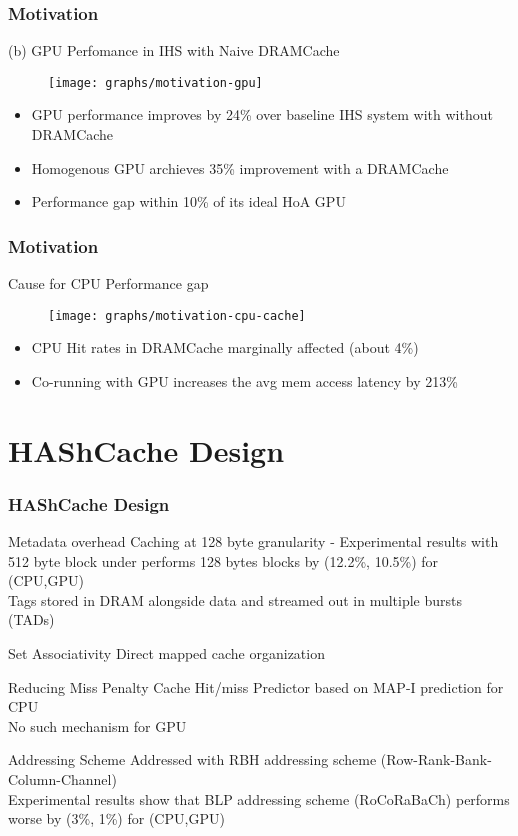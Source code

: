\documentclass{beamer}
\begin{document}
\begin{frame}
\frametitle{Motivation}    
(b) GPU Perfomance in IHS with Naive DRAMCache    
    \begin{figure}    	
    	\texttt{[image: graphs/motivation-gpu]}
    \end{figure}
\begin{itemize}
	\item GPU performance improves by 24\% over baseline IHS system with without DRAMCache
	\item Homogenous GPU archieves 35\% improvement with a DRAMCache
	\item Performance gap within 10\%  of its ideal HoA GPU
\end{itemize}    
\end{frame}

\begin{frame}
\frametitle{Motivation}
Cause for CPU Performance gap
	\begin{figure}
		\texttt{[image: graphs/motivation-cpu-cache]}
	\end{figure}
\begin{itemize}
	\item CPU Hit rates in DRAMCache marginally affected (about 4\%)
	\item Co-running with GPU increases the avg mem access latency by 213\%
\end{itemize}	
\end{frame}

\section{HAShCache Design}

\begin{frame}
	\frametitle{HAShCache Design}
	\begin{block}{Metadata overhead}
		\small
		Caching at 128 byte granularity - Experimental results with 512 byte block under performs 128 bytes blocks by (12.2\%, 10.5\%) for (CPU,GPU)\\
		Tags stored in DRAM alongside data and streamed out in multiple bursts (TADs)
	\end{block}
	\begin{block}{Set Associativity}
		\small
		Direct mapped cache organization
	\end{block}
	\begin{block}{Reducing Miss Penalty}
		\small
		Cache Hit/miss Predictor based on MAP-I prediction for CPU \\
		No such mechanism for GPU
	\end{block}
	\begin{block}{Addressing Scheme}
		\small
		Addressed with RBH addressing scheme (Row-Rank-Bank-Column-Channel) \\ 
		Experimental results show that BLP addressing scheme  (RoCoRaBaCh) performs worse by (3\%, 1\%) for (CPU,GPU)
	\end{block}	
\end{frame}
\end{document}
